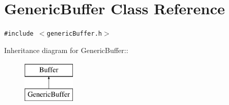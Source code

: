 \hypertarget{classGenericBuffer}{
\section{GenericBuffer Class Reference}
\label{classGenericBuffer}
}
{\tt \#include $<$genericBuffer.h$>$}

Inheritance diagram for GenericBuffer::\begin{figure}[H]
\begin{center}
\leavevmode
\includegraphics[height=2cm]{classGenericBuffer}
\end{center}
\end{figure}
